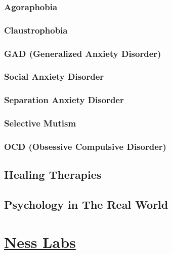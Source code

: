 \documentclass[oneside]{book}
\numberwithin{equation}{section}
\begin{document}
\subsection{Agoraphobia}

\subsection{Claustrophobia}

\subsection{GAD (Generalized Anxiety Disorder)}

\subsection{Social Anxiety Disorder}

\subsection{Separation Anxiety Disorder}

\subsection{Selective Mutism}

\subsection{OCD (Obsessive Compulsive Disorder)}

\section{Healing Therapies}

\section{Psychology in The Real World}


\chapter{\href{https://nesslabs.com/}{Ness Labs}}
\end{document}

